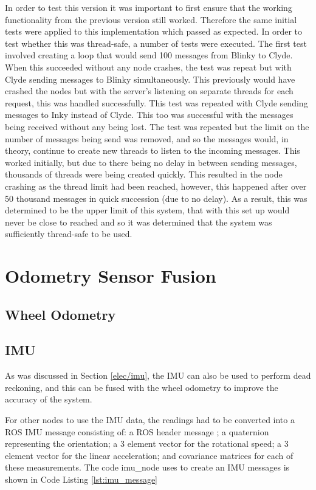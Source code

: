In order to test this version it was important to first ensure that the 
working functionality from the previous version still worked. Therefore 
the same initial tests were applied to this implementation which passed 
as expected. In order to test whether this was thread-safe, a number of 
tests were executed. The first test involved creating a loop that would 
send 100 messages from Blinky to Clyde. When this succeeded without any 
node crashes, the test was repeat but with Clyde sending messages to Blinky 
simultaneously. This previously would have crashed the nodes but with the 
server's listening on separate threads for each request, this was handled 
successfully. This test was repeated with Clyde sending messages to Inky 
instead of Clyde. This too was successful with the messages being received 
without any being lost. The test was repeated but the limit on the number of 
messages being send was removed, and so the messages would, in theory, 
continue to create new threads to listen to the incoming messages. This 
worked initially, but due to there being no delay in between sending messages, 
thousands of threads were being created quickly. This resulted in the node 
crashing as the thread limit had been reached, however, this happened after 
over 50 thousand messages in quick succession (due to no delay). As a result, 
this was determined to be the upper limit of this system, that with this set 
up would never be close to reached and so it was determined that the system 
was sufficiently thread-safe to be used. 


\section{Odometry Sensor Fusion}\label{soft/odometry}

\subsection{Wheel Odometry}\label{soft/odometry/design}


\subsection{IMU}\label{soft/odometry/imu}

As was discussed in Section \ref{elec/imu}, the IMU can also be used to perform dead reckoning, and this can be fused with the wheel odometry to improve the accuracy of the system. 

For other nodes to use the IMU data, the readings had to be converted into a ROS IMU message\cite{ROSIMUMsg} consisting of: a ROS header message \cite{ROSHeaderMsg}; a quaternion representing the orientation; a 3 element vector for the rotational speed; a 3 element vector for the linear acceleration; and covariance matrices for each of these measurements. The code imu\_node uses to create an IMU messages is shown in Code Listing \ref{lst:imu_message}


